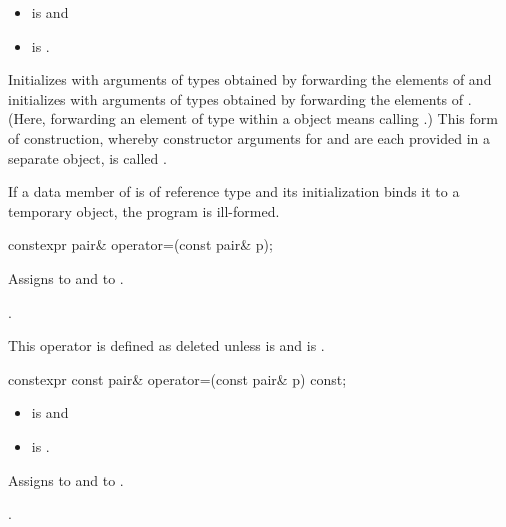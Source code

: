 \begin{itemdescr}
\pnum
\mandates
\begin{itemize}
\item {} is  and
\item {} is .
\end{itemize}

\pnum
\effects
Initializes  with arguments of types
 obtained by forwarding the elements of 
and initializes  with arguments of types 
obtained by forwarding the elements of . (Here, forwarding
an element  of type  within a  object means calling
.) This form of construction, whereby constructor
arguments for  and  are each provided in a separate
 object, is called .
\begin{note}
If a data member of  is of reference type and
its initialization binds it to a temporary object,
the program is ill-formed.
\end{note}
\end{itemdescr}

%
\begin{itemdecl}
constexpr pair& operator=(const pair& p);
\end{itemdecl}

\begin{itemdescr}
\pnum
\effects
Assigns  to  and  to .

\pnum
\returns
{}.

\pnum
\remarks
This operator is defined as deleted unless
 is  and
 is .
\end{itemdescr}

%
\begin{itemdecl}
constexpr const pair& operator=(const pair& p) const;
\end{itemdecl}

\begin{itemdescr}
\pnum
\constraints
\begin{itemize}
\item
{} is  and
\item
{} is .
\end{itemize}

\pnum
\effects
Assigns  to  and  to .

\pnum
\returns
{}.
\end{itemdescr}


